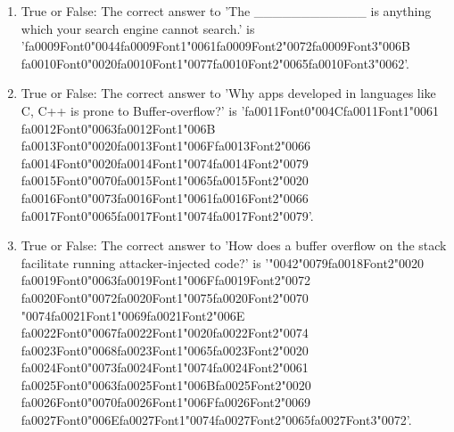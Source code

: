 \documentclass[12pt]{article}
\begin{document}
\begin{enumerate}[label=\arabic*.]
\item True or False: The correct answer to 'The \_\_\_\_\_\_\_\_\_\_\_\_ is anything which your search engine cannot search.' is '{\csname fa0009Font0\endcsname\char"0044}{\csname fa0009Font1\endcsname\char"0061}{\csname fa0009Font2\endcsname\char"0072}{\csname fa0009Font3\endcsname\char"006B} {\csname fa0010Font0\endcsname\char"0020}{\csname fa0010Font1\endcsname\char"0077}{\csname fa0010Font2\endcsname\char"0065}{\csname fa0010Font3\endcsname\char"0062}'.
\item True or False: The correct answer to 'Why apps developed in languages like C, C++ is prone to Buffer-overflow?' is '{\csname fa0011Font0\endcsname\char"004C}{\csname fa0011Font1\endcsname\char"0061} {\csname fa0012Font0\endcsname\char"0063}{\csname fa0012Font1\endcsname\char"006B} {\csname fa0013Font0\endcsname\char"0020}{\csname fa0013Font1\endcsname\char"006F}{\csname fa0013Font2\endcsname\char"0066} {\csname fa0014Font0\endcsname\char"0020}{\csname fa0014Font1\endcsname\char"0074}{\csname fa0014Font2\endcsname\char"0079} {\csname fa0015Font0\endcsname\char"0070}{\csname fa0015Font1\endcsname\char"0065}{\csname fa0015Font2\endcsname\char"0020} {\csname fa0016Font0\endcsname\char"0073}{\csname fa0016Font1\endcsname\char"0061}{\csname fa0016Font2\endcsname\char"0066} {\csname fa0017Font0\endcsname\char"0065}{\csname fa0017Font1\endcsname\char"0074}{\csname fa0017Font2\endcsname\char"0079}'.
\item True or False: The correct answer to 'How does a buffer overflow on the stack facilitate running attacker-injected code?' is '{\char"0042}{\char"0079}{\csname fa0018Font2\endcsname\char"0020} {\csname fa0019Font0\endcsname\char"0063}{\csname fa0019Font1\endcsname\char"006F}{\csname fa0019Font2\endcsname\char"0072} {\csname fa0020Font0\endcsname\char"0072}{\csname fa0020Font1\endcsname\char"0075}{\csname fa0020Font2\endcsname\char"0070} {\char"0074}{\csname fa0021Font1\endcsname\char"0069}{\csname fa0021Font2\endcsname\char"006E} {\csname fa0022Font0\endcsname\char"0067}{\csname fa0022Font1\endcsname\char"0020}{\csname fa0022Font2\endcsname\char"0074} {\csname fa0023Font0\endcsname\char"0068}{\csname fa0023Font1\endcsname\char"0065}{\csname fa0023Font2\endcsname\char"0020} {\csname fa0024Font0\endcsname\char"0073}{\csname fa0024Font1\endcsname\char"0074}{\csname fa0024Font2\endcsname\char"0061} {\csname fa0025Font0\endcsname\char"0063}{\csname fa0025Font1\endcsname\char"006B}{\csname fa0025Font2\endcsname\char"0020} {\csname fa0026Font0\endcsname\char"0070}{\csname fa0026Font1\endcsname\char"006F}{\csname fa0026Font2\endcsname\char"0069} {\csname fa0027Font0\endcsname\char"006E}{\csname fa0027Font1\endcsname\char"0074}{\csname fa0027Font2\endcsname\char"0065}{\csname fa0027Font3\endcsname\char"0072}'.

\end{enumerate}
\end{document}
